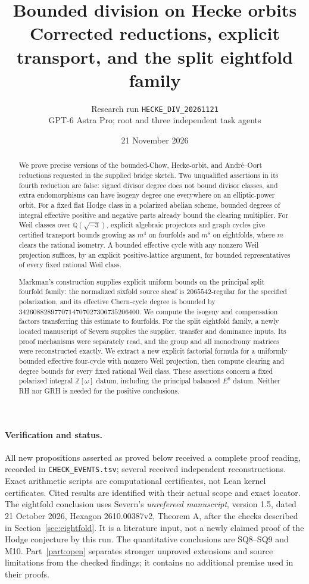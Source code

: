 \documentclass[11pt,a4paper]{article}
\title{Bounded division on Hecke orbits\\\large Corrected reductions, explicit transport, and the split eightfold family}
\author{Research run \texttt{HECKE\_DIV\_20261121}\\\small GPT-6 Astra Pro; root and three independent task agents}
\date{21 November 2026}
\theoremstyle{definition}\newtheorem{definition}[theorem]{Definition}
\theoremstyle{remark}\newtheorem{remark}[theorem]{Remark}
\newcommand{\Q}{\mathbb Q}\newcommand{\Z}{\mathbb Z}\newcommand{\C}{\mathbb C}\newcommand{\R}{\mathbb R}
\begin{document}
\maketitle
\begin{abstract}
We prove precise versions of the bounded-Chow, Hecke-orbit, and Andr\'e--Oort reductions requested in the supplied bridge sketch. Two unqualified assertions in its fourth reduction are false: signed divisor degree does not bound divisor classes, and extra endomorphisms can have isogeny degree one everywhere on an elliptic-power orbit. For a fixed flat Hodge class in a polarized abelian scheme, bounded degrees of integral effective positive and negative parts already bound the clearing multiplier. For Weil classes over $\Q(\sqrt{-3})$, explicit algebraic projectors and graph cycles give certified transport bounds growing as $m^4$ on fourfolds and $m^8$ on eightfolds, where $m$ clears the rational isometry. A bounded effective cycle with any nonzero Weil projection suffices, by an explicit positive-lattice argument, for bounded representatives of every fixed rational Weil class.

Markman's construction supplies explicit uniform bounds on the principal split fourfold family: the normalized sixfold source sheaf is $2065542$-regular for the specified polarization, and its effective Chern-cycle degree is bounded by $3426088289770714707027306735206400$. We compute the isogeny and compensation factors transferring this estimate to fourfolds. For the split eightfold family, a newly located manuscript of Severn supplies the supplier, transfer and dominance inputs. Its proof mechanisms were separately read, and the group and all monodromy matrices were reconstructed exactly. We extract a new explicit factorial formula for a uniformly bounded effective four-cycle with nonzero Weil projection, then compute clearing and degree bounds for every fixed rational Weil class. These assertions concern a fixed polarized integral $\Z[\omega]$ datum, including the principal balanced $E^8$ datum. Neither RH nor GRH is needed for the positive conclusions.
\end{abstract}

\paragraph{Verification and status.}
All new propositions asserted as proved below received a complete proof reading, recorded in \texttt{CHECK\_EVENTS.tsv}; several received independent reconstructions. Exact arithmetic scripts are computational certificates, not Lean kernel certificates. Cited results are identified with their actual scope and exact locator. The eightfold conclusion uses Severn's \emph{unrefereed manuscript}, version 1.5, dated 21 October 2026, Hexagon 2610.00387v2, Theorem A, after the checks described in Section~\ref{sec:eightfold}. It is a literature input, not a newly claimed proof of the Hodge conjecture by this run. The quantitative conclusions are SQ8--SQ9 and M10. Part~\ref{part:open} separates stronger unproved extensions and source limitations from the checked findings; it contains no additional premise used in their proofs.
\end{document}
